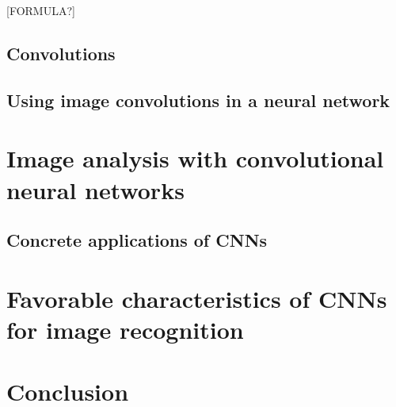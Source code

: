 \documentclass[12pt,a4paper,titlepage]{article}
\begin{document}
[FORMULA?]

\subsection{Convolutions}

\subsection{Using image convolutions in a neural network}

\section{Image analysis with convolutional neural networks}

\subsection{Concrete applications of CNNs}

\section{Favorable characteristics of CNNs for image recognition}

\section{Conclusion}

\clearpage
\begin{flushleft}


\end{flushleft}
\end{document}
